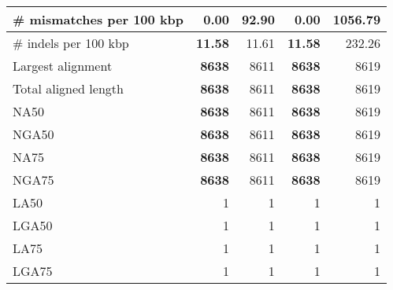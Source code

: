\documentclass[12pt,a4paper]{article}
\begin{document}
\begin{table}[ht]
\begin{center}
\begin{tabular}{|l*{4}{|r}|}
\# mismatches per 100 kbp & {\bf 0.00} & 92.90 & {\bf 0.00} & 1056.79 \\ \hline
\# indels per 100 kbp & {\bf 11.58} & 11.61 & {\bf 11.58} & 232.26 \\ \hline
Largest alignment & {\bf 8638} & 8611 & {\bf 8638} & 8619 \\ \hline
Total aligned length & {\bf 8638} & 8611 & {\bf 8638} & 8619 \\ \hline
NA50 & {\bf 8638} & 8611 & {\bf 8638} & 8619 \\ \hline
NGA50 & {\bf 8638} & 8611 & {\bf 8638} & 8619 \\ \hline
NA75 & {\bf 8638} & 8611 & {\bf 8638} & 8619 \\ \hline
NGA75 & {\bf 8638} & 8611 & {\bf 8638} & 8619 \\ \hline
LA50 & 1 & 1 & 1 & 1 \\ \hline
LGA50 & 1 & 1 & 1 & 1 \\ \hline
LA75 & 1 & 1 & 1 & 1 \\ \hline
LGA75 & 1 & 1 & 1 & 1 \\ \hline
\end{tabular}
\end{center}
\end{table}
\end{document}
